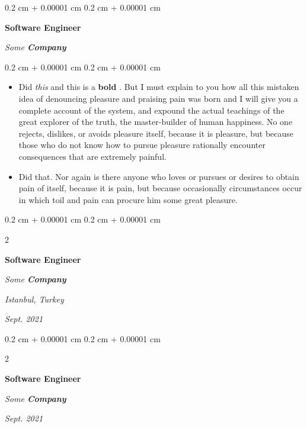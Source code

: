 \documentclass[10pt, letterpaper]{article}
\newenvironment{highlights}{
    \begin{itemize}[
        topsep=0.10 cm,
        parsep=0.10 cm,
        partopsep=0pt,
        itemsep=0pt,
        leftmargin=0.4 cm + 10pt
    ]
}{
    \end{itemize}
} %
\newenvironment{onecolentry}{
    \begin{adjustwidth}{
        0.2 cm + 0.00001 cm
    }{
        0.2 cm + 0.00001 cm
    }
}{
    \end{adjustwidth}
} %
\newenvironment{twocolentry}[2][]{
    \onecolentry
    \def\secondColumn{#2}
    \setcolumnwidth{\fill, 4.5 cm}
    \begin{paracol}{2}
}{
    \switchcolumn \raggedleft \secondColumn
    \end{paracol}
    \endonecolentry
} %
\let\hrefWithoutArrow\href
\renewcommand{\href}[2]{\hrefWithoutArrow{#1}{\mbox{\ifthenelse{\equal{#2}{}}{ }{#2 }\raisebox{.15ex}{\footnotesize \faExternalLink*}}}}
\begin{document}
        \vspace{0.2 cm-3px}

        \begin{onecolentry}
            \textbf{Software Engineer}
            
            \textit{Some \textbf{Company}}
        \end{onecolentry}

        \vspace{0.10 cm-3px}
        \begin{onecolentry}
            \begin{highlights}
                \item Did \textit{this} and this is a \textbf{bold} \href{https://example.com}{link}. But I must explain to you how all this mistaken idea of denouncing pleasure and praising pain was born and I will give you a complete account of the system, and expound the actual teachings of the great explorer of the truth, the master-builder of human happiness. No one rejects, dislikes, or avoids pleasure itself, because it is pleasure, but because those who do not know how to pursue pleasure rationally encounter consequences that are extremely painful.
                \item Did that. Nor again is there anyone who loves or pursues or desires to obtain pain of itself, because it is pain, but because occasionally circumstances occur in which toil and pain can procure him some great pleasure.
            \end{highlights}
        \end{onecolentry}


        \vspace{0.2 cm-3px}

        \begin{twocolentry}{
        \textit{Istanbul, Turkey}    
            
        \textit{Sept. 2021}}
            \textbf{Software Engineer}
            
            \textit{Some \textbf{Company}}
        \end{twocolentry}



        \vspace{0.2 cm-3px}

        \begin{twocolentry}{
            
            
        \textit{Sept. 2021}}
            \textbf{Software Engineer}
            
            \textit{Some \textbf{Company}}
        \end{twocolentry}
\end{document}
